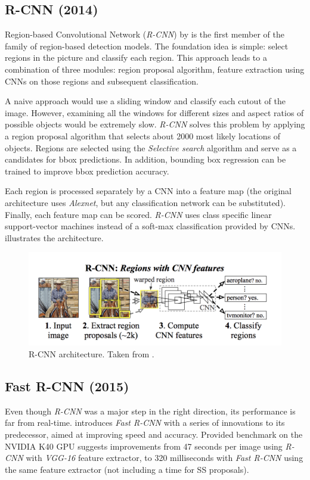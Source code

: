 \subsection{R-CNN (2014)}
Region-based Convolutional Network (\textit{R-CNN}) by \citeauthor{bib:rcnn} \cite{bib:rcnn} is the first member of the family of region-based detection models. The foundation idea is simple: select regions in the picture and classify each region. This approach leads to a combination of three modules: region proposal algorithm, feature extraction using CNNs on those regions and subsequent classification. 

A naive approach would use a sliding window and classify each cutout of the image. However, examining all the windows for different sizes and aspect ratios of possible objects would be extremely slow. \textit{R-CNN} solves this problem by applying a region proposal algorithm that selects about 2000 most likely locations of objects. Regions are selected using the \textit{Selective search} \cite{bib:selectivesearch} algorithm and serve as a candidates for bbox predictions. In addition, bounding box regression can be trained to improve bbox prediction accuracy.

Each region is processed separately by a CNN into a feature map (the original architecture uses \textit{Alexnet}, but any classification network can be substituted). Finally, each feature map can be scored. \textit{R-CNN} uses class specific linear support-vector machines instead of a soft-max classification provided by CNNs.  illustrates the architecture.

\begin{figure}
    \centering
    \includegraphics[width=\textwidth]{img/rcnn}
    \caption[R-CNN architecture]%
    {R-CNN architecture. Taken from \cite[fig. 1]{bib:rcnn}.}
    \label{fig:rcnn}
\end{figure}

\subsection{Fast R-CNN (2015)}
Even though \textit{R-CNN} was a major step in the right direction, its performance is far from real-time. \citeauthor{bib:fastrcnn} \cite{bib:fastrcnn} introduces \textit{Fast R-CNN} with a series of innovations to its predecessor, aimed at improving speed and accuracy. Provided benchmark on the NVIDIA K40 GPU suggests improvements from 47 seconds per image using \textit{R-CNN} with \textit{VGG-16} feature extractor, to 320 milliseconds with \textit{Fast R-CNN} using the same feature extractor (not including a time for SS proposals). 

